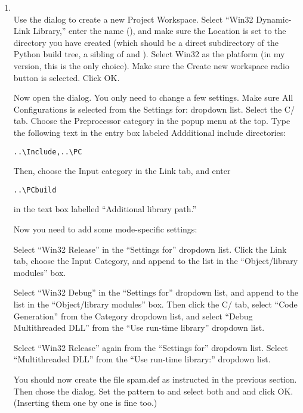 \begin{enumerate}
  \item
  \\
    Use the  dialog to
    create a new Project Workspace.  Select ``Win32 Dynamic-Link
    Library,'' enter the name (), and make sure the
    Location is set to the  directory you have created
    (which should be a direct subdirectory of the Python build tree, a
    sibling of  and ).  Select Win32 as the
    platform (in my version, this is the only choice).  Make sure the
    Create new workspace radio button is selected.  Click OK.

    Now open the  dialog.  You
    only need to change a few settings.  Make sure All Configurations
    is selected from the Settings for: dropdown list.  Select the
    C/\Cpp{} tab.  Choose the Preprocessor category in the popup menu
    at the top.  Type the following text in the entry box labeled
    Addditional include directories:

\begin{verbatim}
..\Include,..\PC
\end{verbatim}

    Then, choose the Input category in the Link tab, and enter

\begin{verbatim}
..\PCbuild
\end{verbatim}

    in the text box labelled ``Additional library path.''

    Now you need to add some mode-specific settings:

    Select ``Win32 Release'' in the ``Settings for'' dropdown list.
    Click the Link tab, choose the Input Category, and append
     to the list in the ``Object/library modules''
    box.

    Select ``Win32 Debug'' in the ``Settings for'' dropdown list, and
    append  to the list in the ``Object/library
    modules'' box.  Then click the C/\Cpp{} tab, select ``Code
    Generation'' from the Category dropdown list, and select ``Debug
    Multithreaded DLL'' from the ``Use run-time library'' dropdown
    list.

    Select ``Win32 Release'' again from the ``Settings for'' dropdown
    list.  Select ``Multithreaded DLL'' from the ``Use run-time
    library:'' dropdown list.

    You should now create the file spam.def as instructed in the
    previous section.  Then chose the  dialog.  Set the pattern to  and select
    both  and  and click OK.  (Inserting
    them one by one is fine too.)
\end{enumerate}


